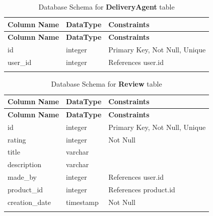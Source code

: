\documentclass[12pt]{report}
\begin{document}
\begin{longtable}[H]{|l|l|p{6.5cm}||}
	\hline
	\textbf{Column Name} & \textbf{DataType} & \textbf{Constraints}          \\
	\hline
	\endfirsthead
	\hline
	\textbf{Column Name} & \textbf{DataType} & \textbf{Constraints}          \\
	\hline
	\endhead
	id                   & integer           & Primary Key, Not Null, Unique \\
	\hline
	user\_id             & integer           & References user.id            \\
	\hline
	\hline
	\caption{Database Schema for \textbf{DeliveryAgent} table}\label{tab:tableDeliveryAgent}
\end{longtable}

\begin{longtable}[H]{|l|l|p{6.5cm}||}
	\hline
	\textbf{Column Name} & \textbf{DataType} & \textbf{Constraints}          \\
	\hline
	\endfirsthead
	\hline
	\textbf{Column Name} & \textbf{DataType} & \textbf{Constraints}          \\
	\hline
	\endhead
	id                   & integer           & Primary Key, Not Null, Unique \\
	\hline
	rating               & integer           & Not Null                      \\
	\hline
	title                & varchar           &                               \\
	\hline
	description          & varchar           &                               \\
	\hline
	made\_by             & integer           & References user.id            \\
	\hline
	product\_id          & integer           & References product.id         \\
	\hline
	creation\_date       & timestamp         & Not Null                      \\
	\hline
	\hline
	\caption{Database Schema for \textbf{Review} table}\label{tab:tableReview}
\end{longtable}
\end{document}
